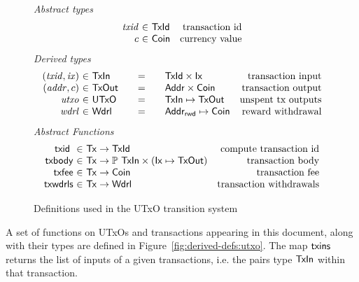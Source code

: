 \documentclass[11pt,a4paper,dvipsnames]{article}
\newcommand{\Tx}{\type{Tx}}
\newcommand{\Ix}{\type{Ix}}
\newcommand{\TxId}{\type{TxId}}
\newcommand{\Addr}{\type{Addr}}
\newcommand{\UTxO}{\type{UTxO}}
\newcommand{\Wdrl}{\type{Wdrl}}
\newcommand{\Coin}{\type{Coin}}
\newcommand{\AddrRWD}{\type{Addr_{rwd}}}
\newcommand{\TxIn}{\type{TxIn}}
\newcommand{\TxOut}{\type{TxOut}}
\newcommand{\txid}[1]{\fun{txid}~ \var{#1}}
\theoremstyle{definition}
\theoremstyle{definition}
\begin{document}
\begin{figure*}
  \emph{Abstract types}
  \begin{equation*}
    \begin{array}{r@{~\in~}lr}
      \var{txid} & \TxId & \text{transaction id}\\
      c & \Coin & \text{currency value}\\
    \end{array}
  \end{equation*}
  \emph{Derived types}
  \begin{equation*}
    \begin{array}{r@{~\in~}l@{\qquad=\qquad}lr}
      (\var{txid}, \var{ix})
      & \TxIn
      & \TxId \times \Ix
      & \text{transaction input}
      \\
      (\var{addr}, c)
      & \type{TxOut}
      & \Addr \times \Coin
      & \text{transaction output}
      \\
      \var{utxo}
      & \UTxO
      & \TxIn \mapsto \TxOut
      & \text{unspent tx outputs}
      \\
      \var{wdrl}
      & \Wdrl
      & \AddrRWD \mapsto \Coin
      & \text{reward withdrawal}
    \end{array}
  \end{equation*}
  \emph{Abstract Functions}
  \begin{equation*}
    \begin{array}{r@{~\in~}lr}
      \txid{} & \Tx \to \TxId & \text{compute transaction id}\\
      \fun{txbody} & \Tx \to \powerset{\TxIn} \times (\Ix \mapsto \TxOut)
                                  & \text{transaction body}\\
      \fun{txfee} & \Tx \to \Coin & \text{transaction fee}\\
      \fun{txwdrls} & \Tx \to \Wdrl & \text{transaction withdrawals}\\
    \end{array}
  \end{equation*}
  \caption{Definitions used in the UTxO transition system}
  \label{fig:defs:utxo}
\end{figure*}


A set of functions on UTxOs and transactions appearing in this document,
along with their types are defined in Figure~\ref{fig:derived-defs:utxo}.
The map $\mathsf{txins}$ returns the list of inputs of a given transactions, i.e.
the pairs type $\TxIn$ within that transaction.
\end{document}
